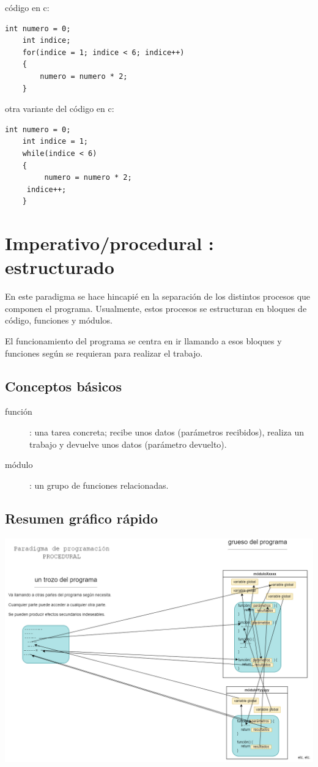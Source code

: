 \documentclass[spanish,12pt,a4paper,final,oneside]{book}
\begin{document}
\begin{enumerate}
código en c:
\begin{lstlisting}[frame=single]
    int numero = 0;
    int indice;
    for(indice = 1; indice < 6; indice++)
    {
        numero = numero * 2;
    }
\end{lstlisting}

otra variante del código en c:
\begin{lstlisting}[frame=single]
	int numero = 0;
	int indice = 1;
	while(indice < 6)
	{
     	 numero = numero * 2;
   	 indice++;
	}
\end{lstlisting}

\end{enumerate}

\section{Imperativo/procedural : estructurado}
En este paradigma se hace hincapié en la separación de los distintos procesos que componen el programa. Usualmente, estos procesos se estructuran en bloques de código, funciones y módulos. 

El funcionamiento del programa se centra en ir llamando a esos bloques y funciones según se requieran para realizar el trabajo.

\subsection*{Conceptos básicos}
\begin{description}
\item[función]: una tarea concreta; recibe unos datos (parámetros recibidos), realiza un trabajo y devuelve unos datos (parámetro devuelto).
\item[módulo]: un grupo de funciones relacionadas.
\end{description}

\subsection*{Resumen gráfico rápido}
\includegraphics[width=\textwidth]{Paradigma de programacion - PROCEDURAL}
\end{document}
